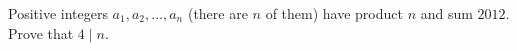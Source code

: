 Positive integers $a_1,a_2,\dots,a_n$ (there are $n$ of them) have product $n$ and sum $2012$. Prove that $4\mid n$.
